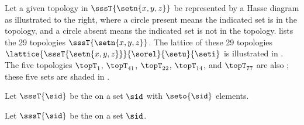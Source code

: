 {{\begin{minipage}{\tw-45mm}
\begin{example}
\label{ex:set_lat_top_xyz}
\footnotemark
Let a given topology in $\sssT{\setn{x,y,z}}$ be represented by a Hasse diagram 
as illustrated to the right, where a circle present means the indicated set is in the topology,
and a circle absent means the indicated set is not in the topology.
 lists the 29 topologies $\sssT{\setn{x,y,z}}$.
The lattice of these 29 topologies $\lattice{\sssT{\setn{x,y,z}}}{\sorel}{\setu}{\seti}$
is illustrated in . %
The five topologies
$\topT_{1}$, $\topT_{41}$, $\topT_{22}$, $\topT_{14}$, and $\topT_{77}$
are also ; 
these five sets are shaded in . %
\end{example}%
\end{minipage}%
%
\hfill{}%

\begin{theorem}
Let $\sssT{\sid}$ be the  on a set $\sid$ with $\seto{\sid}$ elements.
\end{theorem}

\begin{theorem}
Let $\sssT{\sid}$ be the  on a set $\sid$.
\end{theorem}

}}
